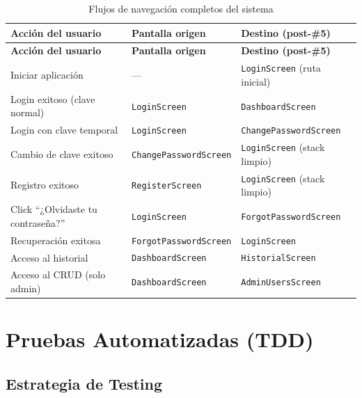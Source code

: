 \documentclass[12pt,a4paper]{article}
\begin{document}
\begin{longtable}{p{5cm} p{4cm} p{4.5cm}}
\caption{Flujos de navegación completos del sistema} \label{tab:flujos-nav} \\
\toprule
\textbf{Acción del usuario} & \textbf{Pantalla origen} & \textbf{Destino (post-\#5)} \\
\midrule
\endfirsthead
\toprule
\textbf{Acción del usuario} & \textbf{Pantalla origen} & \textbf{Destino (post-\#5)} \\
\midrule
\endhead
\bottomrule
\endlastfoot
Iniciar aplicación & --- & \texttt{LoginScreen} (ruta inicial) \\
Login exitoso (clave normal) & \texttt{LoginScreen} & \texttt{DashboardScreen} \\
Login con clave temporal & \texttt{LoginScreen} & \texttt{ChangePasswordScreen} \\
Cambio de clave exitoso & \texttt{ChangePasswordScreen} & \texttt{LoginScreen} (stack limpio) \\
Registro exitoso & \texttt{RegisterScreen} & \texttt{LoginScreen} (stack limpio) \\
Click ``¿Olvidaste tu contraseña?'' & \texttt{LoginScreen} & \texttt{ForgotPasswordScreen} \\
Recuperación exitosa & \texttt{ForgotPasswordScreen} & \texttt{LoginScreen} \\
Acceso al historial & \texttt{DashboardScreen} & \texttt{HistorialScreen} \\
Acceso al CRUD (solo admin) & \texttt{DashboardScreen} & \texttt{AdminUsersScreen} \\
\end{longtable}

\section{Pruebas Automatizadas (TDD)}

\subsection{Estrategia de Testing}
\end{document}
